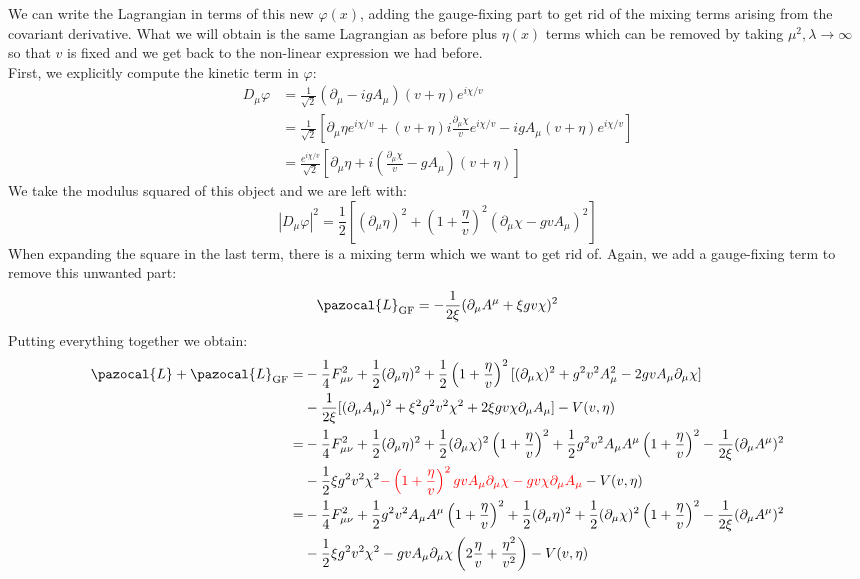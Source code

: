 \documentclass[../main.tex]{subfiles}
\begin{document}
We can write the Lagrangian in terms of this new $\varphi(x)$, adding the gauge-fixing part to get rid of the mixing terms arising from the covariant derivative. What we will obtain is the same Lagrangian as before plus $\eta(x)$ terms which can be removed by taking $\mu^2,\lambda\to\infty$ so that $v$ is fixed and we get back to the non-linear expression we had before.\\
First, we explicitly compute the kinetic term in $\varphi$:
\begin{align*}
D_\mu\varphi&=\frac{1}{\sqrt{2}}(\partial_\mu-igA_\mu)(v+\eta)e^{i\chi/v}\\
&=\frac{1}{\sqrt{2}}\left[\partial_\mu\eta e^{i\chi/v}+(v+\eta)i\frac{\partial_\mu\chi}{v}e^{i\chi/v}-igA_\mu(v+\eta)e^{i\chi/v}\right]\\
&=\frac{e^{i\chi/v}}{\sqrt{2}}\left[\partial_\mu\eta+i\left(\frac{\partial_\mu\chi}{v}-gA_\mu\right)(v+\eta)\right]
\end{align*}
We take the modulus squared of this object and we are left with:
\[
|D_\mu\varphi|^2=\frac{1}{2}\left[(\partial_\mu\eta)^2+\left(1+\frac{\eta}{v}\right)^2(\partial_\mu\chi-gvA_\mu)^2\right]
\]
When expanding the square in the last term, there is a mixing term which we want to get rid of. Again, we add a gauge-fixing term to remove this unwanted part:
\[
\pazocal{L}_{\text{GF}}=-\frac{1}{2\xi}(\partial_\mu A^\mu+\xi gv\chi)^2
\]
Putting everything together we obtain:
\begin{align*}
\pazocal{L}+\pazocal{L}_{\text{GF}}=&-\frac{1}{4}F_{\mu\nu}^2+\frac{1}{2}(\partial_\mu\eta)^2+\frac{1}{2}\left(1+\frac{\eta}{v}\right)^2[(\partial_\mu\chi)^2+g^2v^2A_\mu^2-2gvA_\mu\partial_\mu\chi]\\
&-\frac{1}{2\xi}[(\partial_\mu A_\mu)^2+\xi^2g^2v^2\chi^2+2\xi gv\chi\partial_\mu A_\mu]-V(v,\eta)\\
=&-\frac{1}{4}F_{\mu\nu}^2+\frac{1}{2}(\partial_\mu\eta)^2+\frac{1}{2}(\partial_\mu\chi)^2\left(1+\frac{\eta}{v}\right)^2+\frac{1}{2}g^2v^2A_\mu A^\mu\left(1+\frac{\eta}{v}\right)^2-\frac{1}{2\xi}(\partial_\mu A^\mu)^2\\
&-\frac{1}{2}\xi g^2v^2\chi^2{\color{red}-\left(1+\frac{\eta}{v}\right)^2gvA_\mu\partial_\mu\chi-gv\chi\partial_\mu A_\mu}-V(v,\eta)\\
=&-\frac{1}{4}F_{\mu\nu}^2+\frac{1}{2}g^2v^2A_\mu A^\mu\left(1+\frac{\eta}{v}\right)^2+\frac{1}{2}(\partial_\mu\eta)^2+\frac{1}{2}(\partial_\mu\chi)^2\left(1+\frac{\eta}{v}\right)^2-\frac{1}{2\xi}(\partial_\mu A^\mu)^2\\
&-\frac{1}{2}\xi g^2v^2\chi^2-gvA_\mu\partial_\mu\chi\left(2\frac{\eta}{v}+\frac{\eta^2}{v^2}\right)-V(v,\eta)
\end{align*}
\end{document}
